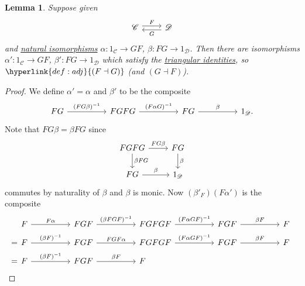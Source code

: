 \documentclass{article}
\let\to\longrightarrow
\newtheorem{nlemma}[nthm]{Lemma}
\begin{document}
\begin{nlemma}\label{lem:3.8}
  Suppose given
  \begin{equation*}
    \begin{tikzcd}
      \mathscr{C} \rar[shift left]{F} & \mathscr{D} \lar[shift left]{G}
    \end{tikzcd}
  \end{equation*}
  and \hyperlink{def:natiso}{natural isomorphisms} $\alpha: 1_{\mathscr{C}} \to GF$, $\beta: FG \to 1_{\mathscr{D}}$.
  Then there are isomorphisms $\alpha': 1_{\mathscr{C}} \to GF$, $\beta': FG \to 1_{\mathscr{D}}$ which satisfy the \hyperlink{def:triId}{triangular identities}, so $\hyperlink{def:adj}{(F \dashv G)}$ (and $(G \dashv F)$).
\end{nlemma}
\begin{proof}
  We define $\alpha' = \alpha$ and $\beta'$ to be the composite
  \begin{equation*}
    \begin{tikzcd}[column sep=huge]
      FG \rar{(FG\beta)^{-1}} & FGFG \rar{(F\alpha G)^{-1}} & FG \rar{\beta} & 1_{\mathscr{D}}.
    \end{tikzcd}
  \end{equation*}
  Note that $FG\beta = \beta{FG}$ since
  \begin{equation*}
    \begin{tikzcd}
      FGFG \rar{FG\beta} \dar{\beta{FG}} & FG \dar{\beta} \\
      FG \rar{\beta} & 1_{\mathscr{D}}
    \end{tikzcd}
  \end{equation*}
  commutes by naturality of $\beta$ and $\beta$ is monic.
  Now $(\beta'_F)(F\alpha')$ is the composite
  \begin{align*}
    &\begin{tikzcd}[ampersand replacement=\&, column sep=huge]
      F \rar{F\alpha} \& FGF \rar{(\beta {FGF})^{-1}} \& FGFGF \rar{(F\alpha{GF})^{-1}} \& FGF \rar{\beta F} \& F
    \end{tikzcd} \\
    =
    &\begin{tikzcd}[ampersand replacement=\&, column sep=huge]
      F \rar{(\beta F)^{-1}} \& FGF \rar{FGF\alpha} \& FGFGF \rar{(F\alpha{GF})^{-1}} \& FGF \rar{\beta F} \& F
    \end{tikzcd} \\
    =
    &\begin{tikzcd}[ampersand replacement=\&, column sep=huge]
      F \rar{(\beta F)^{-1}} \& FGF \rar{\beta F} \& F

\end{tikzcd}
\end{align*}
\end{proof}
\end{document}
